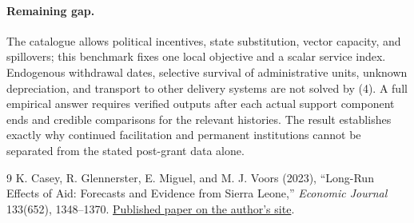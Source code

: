 \documentclass[11pt]{article}
\theoremstyle{definition}
\begin{document}
\paragraph{Remaining gap.}
The catalogue allows political incentives, state substitution, vector capacity, and spillovers; this benchmark fixes one local objective and a scalar service index. Endogenous withdrawal dates, selective survival of administrative units, unknown depreciation, and transport to other delivery systems are not solved by (4). A full empirical answer requires verified outputs after each actual support component ends and credible comparisons for the relevant histories. The result establishes exactly why continued facilitation and permanent institutions cannot be separated from the stated post-grant data alone.

\begin{thebibliography}{9}
 K. Casey, R. Glennerster, E. Miguel, and M. J. Voors (2023), ``Long-Run Effects of Aid: Forecasts and Evidence from Sierra Leone,'' \emph{Economic Journal} 133(652), 1348--1370. \href{https://emiguel.econ.berkeley.edu/wordpress/wp-content/uploads/2023/09/uead001.pdf}{Published paper on the author's site}.
\end{thebibliography}
\end{document}
